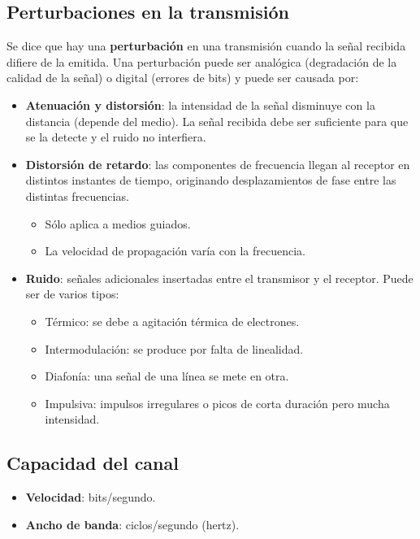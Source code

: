 \documentclass[]{article}
\begin{document}
\subsection{Perturbaciones en la transmisión}
Se dice que hay una \textbf{perturbación} en una transmisión cuando la señal recibida difiere de la emitida. Una perturbación puede ser analógica (degradación de la calidad de la señal) o digital (errores de bits) y puede ser causada por:

\begin{itemize}
    \item \textbf{Atenuación y distorsión}: la intensidad de la señal disminuye con la distancia (depende del medio). La señal recibida debe ser suficiente para que se la detecte y el ruido no interfiera.
    \item \textbf{Distorsión de retardo}: las componentes de frecuencia llegan al receptor en distintos instantes de tiempo, originando desplazamientos de fase entre las distintas frecuencias.
    \begin{itemize}
        \item Sólo aplica a medios guiados.
        \item La velocidad de propagación varía con la frecuencia.
    \end{itemize}
    \item \textbf{Ruido}: señales adicionales insertadas entre el transmisor y el receptor. Puede ser de varios tipos:
    \begin{itemize}
        \item Térmico: se debe a agitación térmica de electrones.
        \item Intermodulación: se produce por falta de linealidad.
        \item Diafonía: una señal de una línea se mete en otra.
        \item Impulsiva: impulsos irregulares o picos de corta duración pero mucha intensidad.
    \end{itemize}
\end{itemize}

\subsection{Capacidad del canal}
\begin{itemize}
    \item \textbf{Velocidad}: bits/segundo.
    \item \textbf{Ancho de banda}: ciclos/segundo (hertz).
\end{itemize}
\end{document}
